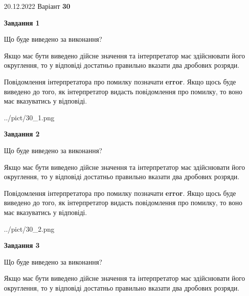 \documentclass[12pt, ukrainian]{article}
\begin{document}
{20.12.2022 Варіант \No \textbf { 30 }\par}
{
\begin {Large}

{\begin {center}\textbf{Завдання 1}\end {center}}\par
Що буде виведено за виконання? \par

Якщо має бути виведено дійсне значення та інтерпретатор має здійснювати його округлення, 
то у відповіді достатньо правильно вказати два дробових розряди.

Повідомлення інтерпретатора про помилку позначати \textbf{error}.
Якщо щось буде виведено до того, як інтерпретатор видасть повідомлення про помилку, 
то воно має вказуватись у відповіді. \par

\begin{center}
	{../pict/30_1.png}
\end{center}
\newpage

{\begin {center}\textbf{Завдання 2}\end {center}}\par
Що буде виведено за виконання? \par

Якщо має бути виведено дійсне значення та інтерпретатор має здійснювати його округлення, 
то у відповіді достатньо правильно вказати два дробових розряди.

Повідомлення інтерпретатора про помилку позначати \textbf{error}.
Якщо щось буде виведено до того, як інтерпретатор видасть повідомлення про помилку, 
то воно має вказуватись у відповіді. \par

\begin{center}
	{../pict/30_2.png}
\end{center}
\newpage

{\begin {center}\textbf{Завдання 3}\end {center}}\par
Що буде виведено за виконання? \par

Якщо має бути виведено дійсне значення та інтерпретатор має здійснювати його округлення, 
то у відповіді достатньо правильно вказати два дробових розряди.


\end{Large}}
\end{document}
